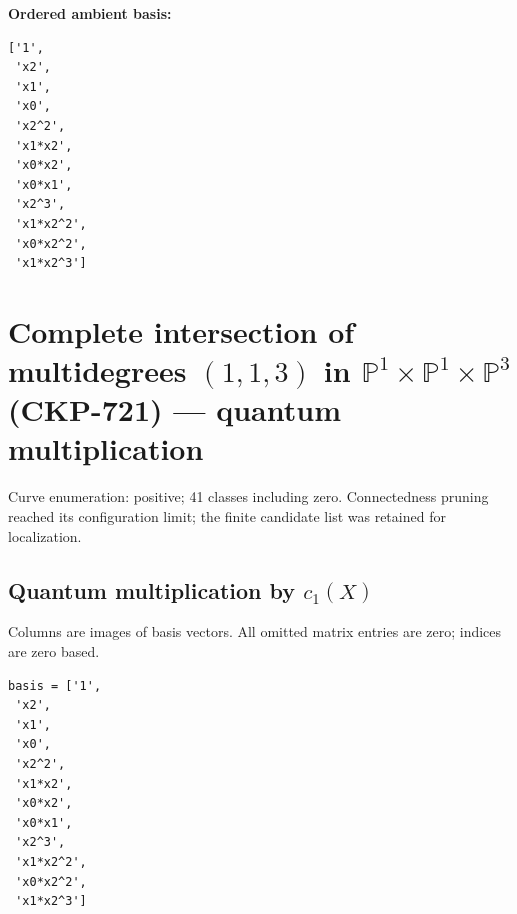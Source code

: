 \documentclass[10pt,a4paper]{article}
\begin{document}
\textbf{Ordered ambient basis:}
\begin{lstlisting}
['1',
 'x2',
 'x1',
 'x0',
 'x2^2',
 'x1*x2',
 'x0*x2',
 'x0*x1',
 'x2^3',
 'x1*x2^2',
 'x0*x2^2',
 'x1*x2^3']
\end{lstlisting}

\clearpage\section*{Complete intersection of multidegrees $(1,1,3)$ in $\mathbb P^{1}\times \mathbb P^{1}\times \mathbb P^{3}$ (CKP-721) --- quantum multiplication}

Curve enumeration: positive; 41 classes including zero.
Connectedness pruning reached its configuration limit; the finite candidate list was retained for localization.
\subsection*{Quantum multiplication by $c_1(X)$}
Columns are images of basis vectors. All omitted matrix entries are zero; indices are zero based.

\begin{lstlisting}
basis = ['1',
 'x2',
 'x1',
 'x0',
 'x2^2',
 'x1*x2',
 'x0*x2',
 'x0*x1',
 'x2^3',
 'x1*x2^2',
 'x0*x2^2',
 'x1*x2^3']
\end{lstlisting}
\end{document}
